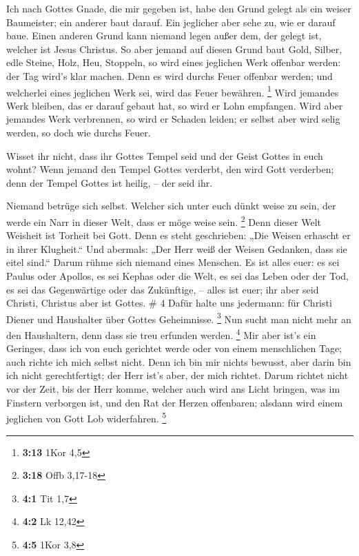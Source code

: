  Ich nach Gottes Gnade, die mir gegeben ist, habe den Grund
gelegt als ein weiser Baumeister; ein anderer baut darauf. Ein jeglicher
aber sehe zu, wie er darauf baue.  Einen anderen Grund kann
niemand legen außer dem, der gelegt ist, welcher ist Jesus Christus.
 So aber jemand auf diesen Grund baut Gold, Silber, edle
Steine, Holz, Heu, Stoppeln,  so wird eines jeglichen Werk
offenbar werden: der Tag wird's klar machen. Denn es wird durchs Feuer
offenbar werden; und welcherlei eines jeglichen Werk sei, wird das Feuer
bewähren. \footnote{\textbf{3:13} 1Kor 4,5}  Wird jemandes
Werk bleiben, das er darauf gebaut hat, so wird er Lohn empfangen.
 Wird aber jemandes Werk verbrennen, so wird er Schaden
leiden; er selbst aber wird selig werden, so doch wie durchs Feuer.

 Wisset ihr nicht, dass ihr Gottes Tempel seid und der
Geist Gottes in euch wohnt?  Wenn jemand den Tempel Gottes
verderbt, den wird Gott verderben; denn der Tempel Gottes ist heilig, --
der seid ihr.

 Niemand betrüge sich selbst. Welcher sich unter euch dünkt
weise zu sein, der werde ein Narr in dieser Welt, dass er möge weise
sein. \footnote{\textbf{3:18} Offb 3,17-18}  Denn dieser
Welt Weisheit ist Torheit bei Gott. Denn es steht geschrieben: „Die
Weisen erhascht er in ihrer Klugheit.``  Und abermals: „Der
Herr weiß der Weisen Gedanken, dass sie eitel sind.`` 
Darum rühme sich niemand eines Menschen. Es ist alles euer:
 es sei Paulus oder Apollos, es sei Kephas oder die Welt,
es sei das Leben oder der Tod, es sei das Gegenwärtige oder das
Zukünftige, -- alles ist euer;  ihr aber seid Christi,
Christus aber ist Gottes. \# 4  Dafür halte uns jedermann:
für Christi Diener und Haushalter über Gottes Geheimnisse. \footnote{\textbf{4:1}
  Tit 1,7}  Nun sucht man nicht mehr an den Haushaltern,
denn dass sie treu erfunden werden. \footnote{\textbf{4:2} Lk 12,42}
 Mir aber ist's ein Geringes, dass ich von euch gerichtet
werde oder von einem menschlichen Tage; auch richte ich mich selbst
nicht.  Denn ich bin mir nichts bewusst, aber darin bin ich
nicht gerechtfertigt; der Herr ist's aber, der mich richtet.
 Darum richtet nicht vor der Zeit, bis der Herr komme,
welcher auch wird ans Licht bringen, was im Finstern verborgen ist, und
den Rat der Herzen offenbaren; alsdann wird einem jeglichen von Gott Lob
widerfahren. \footnote{\textbf{4:5} 1Kor 3,8}

